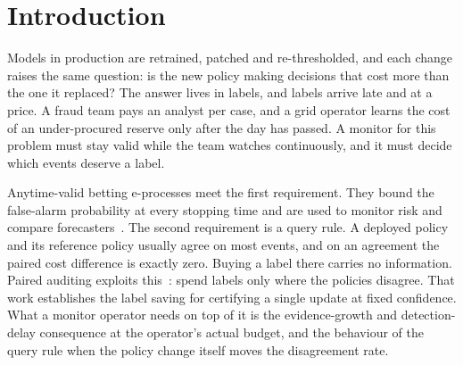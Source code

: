 \begin{abstract}
A deployed model is replaced or adapted, and the team wants to know, as labels trickle in, whether its decisions cost more than a reference policy's.
Labels are expensive, so the monitor must choose which events to pay for.
We study this selective-label harm monitoring problem with anytime-valid betting e-processes and a pre-registered protocol.
Querying only the events where the two policies disagree raises evidence growth by $7.20\times$ at matched label spend
(95\% interval $6.88$--$7.55$) and wins $100$ of $100$ discordant detection comparisons at a $5\%$ budget.
A closed-form growth calculation that gives each arm its own support bound predicts the gain within $15\%$ at every budget.
When a policy intervention raises disagreement from $8\%$ to $41\%$, past-paced gating keeps the monitor running $1.9\times$ longer
than fixed-rate gating at identical label counts, detects equally often, and takes $1.4$--$2\times$ longer to alarm.
A sweep over $5$ intervention strengths and $4$ budgets maps where detection succeeds: at budgets of $5\%$ or less every selective monitor stays
below $0.30$ detection, while at $20\%$ they reach $0.87$ to $0.99$ once the intervention is moderate or stronger.
Null calibration passes on $2{,}000$ streams per cell, and on four real electricity-demand paths the monitors raise no false alarms and
detect injected under-procurement as fast as full feedback from a $5\%$ budget.
\end{abstract}

\section{Introduction}\label{sec:intro}

Models in production are retrained, patched and re-thresholded, and each change raises the same question: is the new
policy making decisions that cost more than the one it replaced? The answer lives in labels, and labels arrive late and at a price.
A fraud team pays an analyst per case, and a grid operator learns the cost of an under-procured reserve only after the day has passed.
A monitor for this problem must stay valid while the team watches continuously, and it must decide which events deserve a label.

Anytime-valid betting e-processes meet the first requirement. They bound the false-alarm probability at every stopping time and
are used to monitor risk and compare forecasters~\citep{waudbysmith2024,choe2022comparing,timans2025}.
The second requirement is a query rule. A deployed policy and its reference policy usually agree on most events, and on an agreement the paired cost difference is exactly zero.
Buying a label there carries no information. Paired auditing exploits this~\citep{mcnemar1947,discern}: spend labels only where the policies disagree.
That work establishes the label saving for certifying a single update at fixed confidence. What a monitor operator needs on top of it is the evidence-growth
and detection-delay consequence at the operator's actual budget, and the behaviour of the query rule when the policy change itself moves the disagreement rate.

